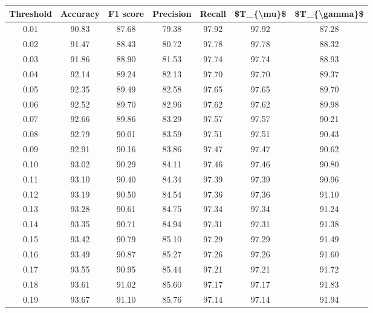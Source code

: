 \begin{tabular}{|c|c|c|c|c|c|c|}
\toprule
 Threshold &  Accuracy &  F1 score &  Precision &  Recall &  \$T\_\{\textbackslash mu\}\$ &  \$T\_\{\textbackslash gamma\}\$ \\
\hline
      0.01 &     90.83 &     87.68 &      79.38 &   97.92 &      97.92 &         87.28 \\
      0.02 &     91.47 &     88.43 &      80.72 &   97.78 &      97.78 &         88.32 \\
      0.03 &     91.86 &     88.90 &      81.53 &   97.74 &      97.74 &         88.93 \\
      0.04 &     92.14 &     89.24 &      82.13 &   97.70 &      97.70 &         89.37 \\
      0.05 &     92.35 &     89.49 &      82.58 &   97.65 &      97.65 &         89.70 \\
      0.06 &     92.52 &     89.70 &      82.96 &   97.62 &      97.62 &         89.98 \\
      0.07 &     92.66 &     89.86 &      83.29 &   97.57 &      97.57 &         90.21 \\
      0.08 &     92.79 &     90.01 &      83.59 &   97.51 &      97.51 &         90.43 \\
      0.09 &     92.91 &     90.16 &      83.86 &   97.47 &      97.47 &         90.62 \\
      0.10 &     93.02 &     90.29 &      84.11 &   97.46 &      97.46 &         90.80 \\
      0.11 &     93.10 &     90.40 &      84.34 &   97.39 &      97.39 &         90.96 \\
      0.12 &     93.19 &     90.50 &      84.54 &   97.36 &      97.36 &         91.10 \\
      0.13 &     93.28 &     90.61 &      84.75 &   97.34 &      97.34 &         91.24 \\
      0.14 &     93.35 &     90.71 &      84.94 &   97.31 &      97.31 &         91.38 \\
      0.15 &     93.42 &     90.79 &      85.10 &   97.29 &      97.29 &         91.49 \\
      0.16 &     93.49 &     90.87 &      85.27 &   97.26 &      97.26 &         91.60 \\
      0.17 &     93.55 &     90.95 &      85.44 &   97.21 &      97.21 &         91.72 \\
      0.18 &     93.61 &     91.02 &      85.60 &   97.17 &      97.17 &         91.83 \\
      0.19 &     93.67 &     91.10 &      85.76 &   97.14 &      97.14 &         91.94 \\

\end{tabular}
